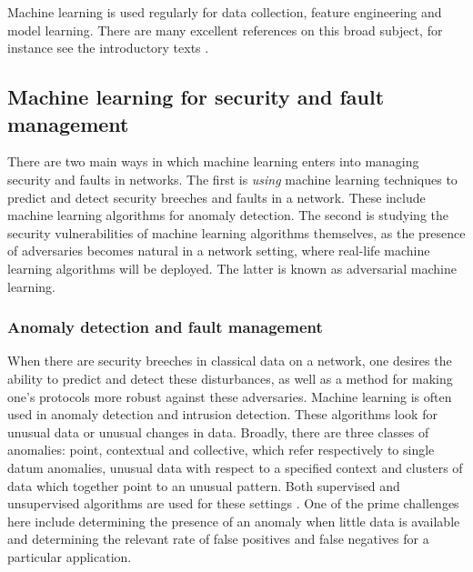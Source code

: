 \documentclass[twocolumn, aps, rmp, amsmath, amssymb, nofootinbib, superscriptaddress, longbibliography, floatfix, table-of-contents, eqsecnum]{revtex4-2}
\begin{document}
Machine learning is used regularly for data collection, feature engineering and model learning. There are many excellent references on this broad subject, for instance see the introductory texts \cite{bishop2006pattern, shalev2014understanding, trevor2009elements, marsland2011machine, flach2012machine}.


\subsection{Machine learning for security and fault management}
There are two main ways in which  machine learning enters into managing security and faults in networks. The first is \textit{using} machine learning techniques to predict and detect security breeches and faults in a network. These include machine learning algorithms for anomaly detection. The second is studying the security vulnerabilities of machine learning algorithms themselves, as the presence of adversaries becomes natural in a network setting, where real-life machine learning algorithms will be deployed. The latter is known as adversarial machine learning.

\subsubsection{Anomaly detection and fault management}

When there are security breeches in classical data on a network, one desires the ability to predict and detect these disturbances, as well as a method for making one's protocols more robust against these adversaries. Machine learning is often used in anomaly detection and intrusion detection. These algorithms look for unusual data or unusual changes in data. Broadly, there are three classes of anomalies: point, contextual and collective, which refer respectively to single datum anomalies, unusual data with respect to a specified context and clusters of data which together point to an unusual pattern. Both supervised and unsupervised algorithms are used for these settings \cite{thottan2003anomaly, ahmed2007machine}. One of the prime challenges here include determining the presence of an anomaly when little data is available and determining the relevant rate of false positives and false negatives for a particular application.
\end{document}
